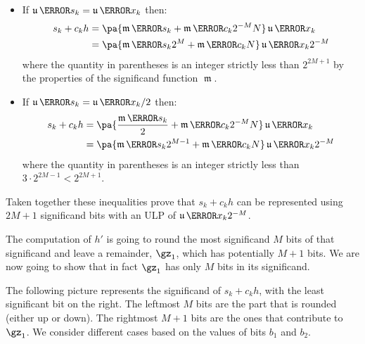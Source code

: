 \documentclass[10pt, a4paper, twoside]{basestyle}
\DeclareMathOperator{\ULP}{\mathfrak u}
\DeclareMathOperator{\mant}{\mathfrak m}
\begin{document}
\begin{itemize} 
\item If $\ULP\of{s_k} = \ULP\of{x_k}$ then:
\begin{align*}
s_k + c_k h &= \pa{\mant\of{s_k} + \mant\of{c_k} 2^{-M} N} \ULP\of{x_k} \\
&= \pa{\mant\of{s_k} 2^M + \mant\of{c_k} N} \ULP\of{x_k} 2^{-M}
\end{align*}
where the quantity in parentheses is an integer strictly less than $2^{2 M + 1}$ by the properties of the significand function $\mant$.
\item If $\ULP\of{s_k} = \ULP\of{x_k} / 2$ then:
\begin{align*}
s_k + c_k h &= \pa{\frac{\mant\of{s_k}}{2} + \mant\of{c_k} 2^{-M} N} \ULP\of{x_k} \\
&= \pa{\mant\of{s_k} 2^{M - 1} + \mant\of{c_k} N} \ULP\of{x_k} 2^{-M}
\end{align*}
where the quantity in parentheses is an integer strictly less than $3 \cdot 2^{2 M - 1} < 2^{2 M + 1}$.
\end{itemize}
Taken together these inequalities prove that $s_k + c_k h$ can be represented using $2 M + 1$ significand bits with an ULP of $\ULP\of{x_k} 2^{-M}$.

The computation of $h'$ is going to round the most significand $M$ bits of that significand and leave a remainder, $\gz_1$, which has potentially $M + 1$ bits.  We are now going to show that in fact $\gz_1$ has only $M$ bits in its significand.

The following picture represents the significand of $s_k + c_k h$, with the least significant bit on the right.  The leftmost $M$ bits are the part that is rounded (either up or down).  The rightmost $M + 1$ bits are the ones that contribute to $\gz_1$.  We consider different cases based on the values of bits $b_1$ and $b_2$.
\begin{center}
\end{center}
\end{document}
